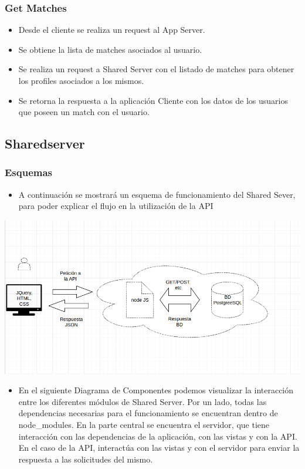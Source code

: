 \documentclass[letterpaper,10pt,english]{sphinxmanual}
\begin{document}
\subsubsection{Get Matches}
\label{manuals:get-matches}\begin{itemize}
\item {} 
Desde el cliente se realiza un request al App Server.

\item {} 
Se obtiene la lista de matches asociados al usuario.

\item {} 
Se realiza un request a Shared Server con el listado de matches para obtener los profiles asociados a los mismos.

\item {} 
Se retorna la respuesta a la aplicación Cliente con los datos de los usuarios que poseen un match con el usuario.

\end{itemize}


\subsection{Sharedserver}
\label{manuals:sharedserver}

\subsubsection{Esquemas}
\label{manuals:id1}\begin{itemize}
\item {} 
A continuación se mostrará un esquema de funcionamiento del Shared Sever, para poder explicar el flujo en la utilización de la API

\end{itemize}

\includegraphics{esquemaShared.png}
\begin{itemize}
\item {} 
En el siguiente Diagrama de Componentes podemos visualizar la interacción entre los diferentes módulos de Shared Server. Por un lado, todas las dependencias necesarias para el funcionamiento se encuentran dentro de node\_modules. En la parte central se encuentra el servidor, que tiene interacción con las dependencias de la aplicación, con las vistas y con la API. En el caso de la API, interactúa con las vistas y con el servidor para enviar la respuesta a las solicitudes del mismo.

\end{itemize}
\end{document}
